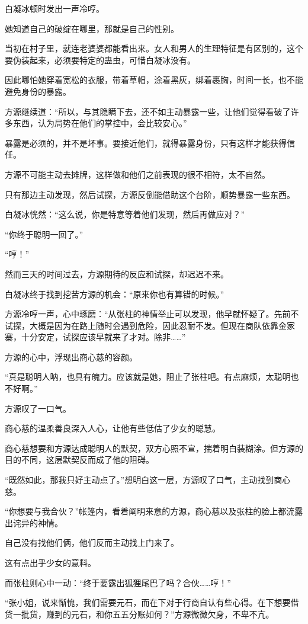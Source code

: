 \begin{this_body}
白凝冰顿时发出一声冷哼。

她知道自己的破绽在哪里，那就是自己的性别。

当初在村子里，就连老婆婆都能看出来。女人和男人的生理特征是有区别的，这个要伪装起来，必须要特定的蛊虫，可惜白凝冰没有。

因此哪怕她穿着宽松的衣服，带着草帽，涂着黑灰，绑着裹胸，时间一长，也不能避免身份的暴露。

方源继续道：“所以，与其隐瞒下去，还不如主动暴露一些，让他们觉得看破了许多东西，认为局势在他们的掌控中，会比较安心。”

暴露是必须的，并不是坏事。要接近他们，就得暴露身份，只有这样才能获得信任。

方源不可能主动去摊牌，这样做和他们之前表现的很不相符，太不自然。

只有那边主动发现，然后试探，方源反倒能借助这个台阶，顺势暴露一些东西。

白凝冰恍然：“这么说，你是特意等着他们发现，然后再做应对？”

“你终于聪明一回了。”

“哼！”

然而三天的时间过去，方源期待的反应和试探，却迟迟不来。

白凝冰终于找到挖苦方源的机会：“原来你也有算错的时候。”

方源冷哼一声，心中琢磨：“从张柱的神情举止可以发现，他早就怀疑了。先前不试探，大概是因为在路上随时会遇到危险，因此忍耐不发。但现在商队依靠金家寨，十分安定，试探应该早就来了才对。除非……”

方源的心中，浮现出商心慈的容颜。

“真是聪明人呐，也具有魄力。应该就是她，阻止了张柱吧。有点麻烦，太聪明也不好啊。”

方源叹了一口气。

商心慈的温柔善良深入人心，让他有些低估了少女的聪慧。

商心慈想要和方源达成聪明人的默契，双方心照不宣，揣着明白装糊涂。但方源的目的不同，这层默契反而成了他的阻碍。

“既然如此，那我只好主动点了。”想明白这一层，方源叹了口气，主动找到商心慈。

“你想要与我合伙？”帐篷内，看着阐明来意的方源，商心慈以及张柱的脸上都流露出诧异的神情。

自己没有找他们俩，他们反而主动找上门来了。

这有点出乎少女的意料。

而张柱则心中一动：“终于要露出狐狸尾巴了吗？合伙……哼！”

“张小姐，说来惭愧，我们需要元石，而在下对于行商自认有些心得。在下想要借贷一批货，赚到的元石，和你五五分账如何？”方源微微欠身，不卑不亢。


\end{this_body}
